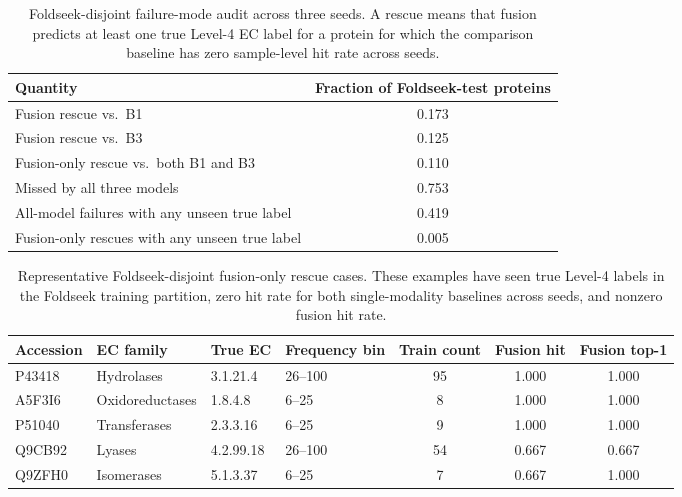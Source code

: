 \documentclass[11pt,a4paper]{article}
\begin{document}
\begin{table}[htbp]
\centering
\caption{Foldseek-disjoint failure-mode audit across three seeds. A rescue means
that fusion predicts at least one true Level-4 EC label for a protein for which
the comparison baseline has zero sample-level hit rate across seeds.}
\label{tab:foldseek_failure_modes}
\small
\setlength{\tabcolsep}{5pt}
\begin{tabular}{lc}
\toprule
Quantity & Fraction of Foldseek-test proteins \\
\midrule
Fusion rescue vs.\ B1 & 0.173 \\
Fusion rescue vs.\ B3 & 0.125 \\
Fusion-only rescue vs.\ both B1 and B3 & 0.110 \\
Missed by all three models & 0.753 \\
All-model failures with any unseen true label & 0.419 \\
Fusion-only rescues with any unseen true label & 0.005 \\
\bottomrule
\end{tabular}
\end{table}

\begin{table}[htbp]
\centering
\caption{Representative Foldseek-disjoint fusion-only rescue cases. These
examples have seen true Level-4 labels in the Foldseek training partition, zero
hit rate for both single-modality baselines across seeds, and nonzero fusion hit
rate.}
\label{tab:foldseek_fusion_rescue_cases}
\small
\setlength{\tabcolsep}{4pt}
\begin{tabular}{llllccc}
\toprule
Accession & EC family & True EC & Frequency bin & Train count & Fusion hit & Fusion top-1 \\
\midrule
P43418 & Hydrolases & 3.1.21.4 & 26--100 & 95 & 1.000 & 1.000 \\
A5F3I6 & Oxidoreductases & 1.8.4.8 & 6--25 & 8 & 1.000 & 1.000 \\
P51040 & Transferases & 2.3.3.16 & 6--25 & 9 & 1.000 & 1.000 \\
Q9CB92 & Lyases & 4.2.99.18 & 26--100 & 54 & 0.667 & 0.667 \\
Q9ZFH0 & Isomerases & 5.1.3.37 & 6--25 & 7 & 0.667 & 1.000 \\
\bottomrule
\end{tabular}
\end{table}
\end{document}
